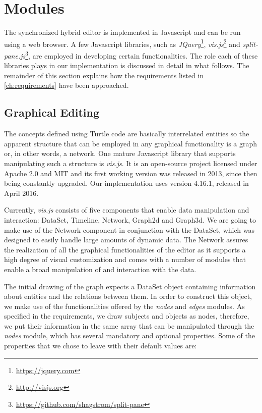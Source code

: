 \section {Modules}

The synchronized hybrid editor is implemented in Javascript and can be run using a web browser. A few Javascript libraries, such as \textit{JQuery}\footnote{\url{https://jquery.com}}, \textit{vis.js}\footnote{\url{http://visjs.org}} and \textit{split-pane.js}\footnote{\url{https://github.com/shagstrom/split-pane}}, are employed in developing certain functionalities. The role each of these libraries plays in our implementation is discussed in detail in what follows. The remainder of this section explains how the requirements listed in \autoref{ch:requirements} have been approached.

\subsection {Graphical Editing}
\label{subsec:graphical_editing}

The concepts defined using Turtle code are basically interrelated entities so the apparent structure that can be employed in any graphical functionality is a graph or, in other words, a network. One mature Javascript library that supports manipulating such a structure is \textit{vis.js}. It is an open-source project licensed under Apache 2.0 and MIT and its first working version was released in 2013, since then being constantly upgraded. Our implementation uses version 4.16.1, released in April 2016. 

Currently, \textit{vis.js} consists of five components that enable data manipulation and interaction: DataSet, Timeline, Network, Graph2d and Graph3d. We are going to make use of the Network component in conjunction with the DataSet, which was designed to easily handle large amounts of dynamic data. The Network assures the realization of all the graphical functionalities of the editor as it supports a high degree of visual customization and comes with a number of modules that enable a broad manipulation of and interaction with the data.

The initial drawing of the graph expects a DataSet object containing information about entities and the relations between them. In order to construct this object, we make use of the functionalities offered by the \textit{nodes} and \textit{edges} modules. As specified in the requirements, we draw subjects and objects as nodes, therefore, we put their information in the same array that can be manipulated through the \textit{nodes} module, which has several mandatory and optional properties. Some of the properties that we chose to leave with their default values are:

